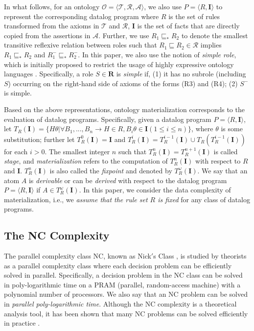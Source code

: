 \documentclass[final,1p,times]{elsarticle}
\begin{document}
In what follows, for an ontology $\mathcal{O}=\langle\mathcal{T},\mathcal{R},\mathcal{A}\rangle$,
we also use $P=\langle R, \textbf{I}\rangle$ to represent the corresponding datalog program
where $R$ is the set of rules transformed from the axioms in $\mathcal{T}$ and $\mathcal{R}$,
$\textbf{I}$ is the set of facts that are directly copied from the assertions in $\mathcal{A}$.
Further, we use $R_1\sqsubseteq_{*}R_2$ to denote the smallest transitive reflexive relation
between roles such that $R_1\sqsubseteq R_2\in\mathcal{R}$ implies $R_1\sqsubseteq_{*}R_2$
and $R_1^-\sqsubseteq_{*}R_2^-$. In this paper, we also use the
notion of \emph{simple role}, which is initially proposed to restrict the
usage of highly expressive ontology languages \cite{HorrocksS04}.
Specifically, a role $S\in\textbf{R}$ is \emph{simple} if, (1) it has no subrole (including $S$)
occurring on the right-hand side of axioms of the forms (R3) and (R4); (2) $S^-$ is simple.

Based on the above representations, ontology materialization
corresponds to the evaluation of datalog programs.
Specifically, given a datalog program $P=\langle R, \textbf{I}\rangle$,
let $T_R(\textbf{I})=\{H\theta|\forall B_1,...,B_n\rightarrow H\in R, B_i\theta\in\textbf{I} (1\leq i\leq n)\}$,
where $\theta$ is some substitution; further let $T_R^{0}(\textbf{I})=\textbf{I}$ and
 $T_R^{i}(\textbf{I})=T_R^{i-1}(\textbf{I})\cup T_R(T_R^{i-1}(\textbf{I}))$ for each $i>0$.
The smallest integer $n$ such that $T_R^{n}(\textbf{I})= T_R^{n+1}(\textbf{I})$ is called \emph{stage},
and \emph{materialization} refers to the computation of $T_R^{n}(\textbf{I})$ with respect to $R$ and \textbf{I}.
$T_R^{n}(\textbf{I})$ is also called the \emph{fixpoint} and denoted by $T_R^{\omega}(\textbf{I})$.
We say that an atom $A$ is \emph{derivable} or can be \emph{derived} with respect
to the datalog program $P=\langle R, \textbf{I}\rangle$ if $A\in T_R^{\omega}(\textbf{I})$.
In this paper, we consider the data complexity of materialization, i.e., we \emph{assume that the rule set $R$ is fixed}
for any class of datalog programs.


\subsection{The NC Complexity}

The parallel complexity class NC, known as Nick$'$s
Class \cite{Raymond95}, is studied by theorists as a parallel complexity class
where each decision problem can be efficiently solved in parallel.
Specifically, a decision problem in the NC class
can be solved in poly-logarithmic time on a PRAM (parallel, random-access machine) with 
a polynomial number of processors. We also say that an NC problem can be solved
in \emph{parallel poly-logarithmic time}.
Although the NC complexity is a theoretical analysis tool,
it has been shown that many NC problems can be solved efficiently in practice \cite{Raymond95}.
\end{document}
